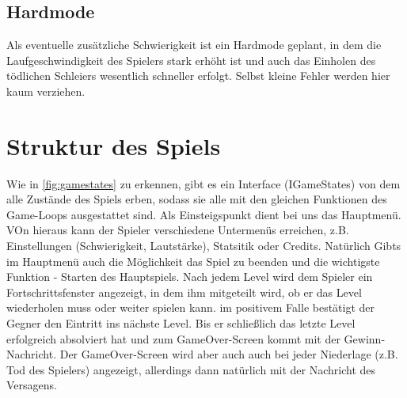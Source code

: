 \documentclass{article}
\begin{document}
\subsection{Hardmode}

Als eventuelle zusätzliche Schwierigkeit ist ein Hardmode geplant, in dem die Laufgeschwindigkeit des Spielers stark erhöht ist und auch das Einholen des tödlichen Schleiers wesentlich schneller erfolgt. Selbst kleine Fehler werden hier kaum verziehen.

\vspace{1cm}
\section{Struktur des Spiels}

Wie in \ref{fig:gamestates} zu erkennen, gibt es ein Interface (IGameStates) von dem alle Zustände des Spiels erben, sodass sie alle mit den gleichen Funktionen des Game-Loops ausgestattet sind. \newline
Als Einsteigspunkt dient bei uns das Hauptmenü. VOn hieraus kann der Spieler verschiedene Untermenüs erreichen, z.B. Einstellungen (Schwierigkeit, Lautstärke), Statsitik oder Credits.
Natürlich Gibts im Hauptmenü auch die Möglichkeit das Spiel zu beenden und die wichtigste Funktion - Starten des Hauptspiels.
Nach jedem Level wird dem Spieler ein Fortschrittsfenster angezeigt, in dem ihm mitgeteilt wird, ob er das Level wiederholen muss oder weiter spielen kann.
im positivem Falle bestätigt der Gegner den Eintritt ins nächste Level. Bis er schließlich das letzte Level erfolgreich absolviert hat und zum GameOver-Screen kommt mit der Gewinn-Nachricht. Der GameOver-Screen wird aber auch auch bei jeder Niederlage (z.B. Tod des Spielers) angezeigt, allerdings dann natürlich mit der Nachricht des Versagens.
\end{document}
